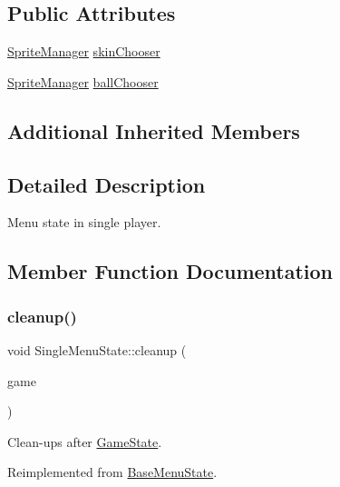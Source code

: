 \subsection*{Public Attributes}
\begin{DoxyCompactItemize}
\item 
\mbox{\hyperlink{class_sprite_manager}{Sprite\+Manager}} \mbox{\hyperlink{class_single_menu_state_a9af6604efafd09a53f4305060741ea93}{skin\+Chooser}}
\item 
\mbox{\hyperlink{class_sprite_manager}{Sprite\+Manager}} \mbox{\hyperlink{class_single_menu_state_acd999dc3a327d8cb340b9f46abc08397}{ball\+Chooser}}
\end{DoxyCompactItemize}
\subsection*{Additional Inherited Members}


\subsection{Detailed Description}
Menu state in single player. 

\subsection{Member Function Documentation}
\mbox{\label{class_single_menu_state_a61fdbb1a47f269d9f99f99ef9312624f}} 
\subsubsection{\texorpdfstring{cleanup()}{cleanup()}}
{\footnotesize\ttfamily void Single\+Menu\+State\+::cleanup (\begin{DoxyParamCaption}\item[{\mbox{\hyperlink{class_game_engine}{Game\+Engine}} $\ast$}]{game }\end{DoxyParamCaption})\hspace{0.3cm}{\ttfamily [virtual]}}



Clean-\/ups after \mbox{\hyperlink{class_game_state}{Game\+State}}. 



Reimplemented from \mbox{\hyperlink{class_base_menu_state_a6ca2a29b45a0c2d6d2cbbb6ee67d38ac}{Base\+Menu\+State}}.

